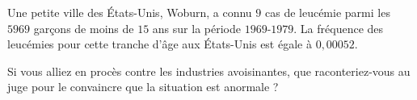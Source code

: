 
\begin{exercice}\label{exosmath-0380}

Une petite ville des États-Unis, Woburn, a connu $9$ cas de leucémie parmi les $5969$ garçons de moins de $15$ ans sur la période $1969$-$1979$. La fréquence des leucémies pour cette tranche d’âge aux États-Unis est égale à $0,00052$.

Si vous alliez en procès contre les industries avoisinantes, que raconteriez-vous au juge pour le convaincre que la situation est anormale ?

\end{exercice}

